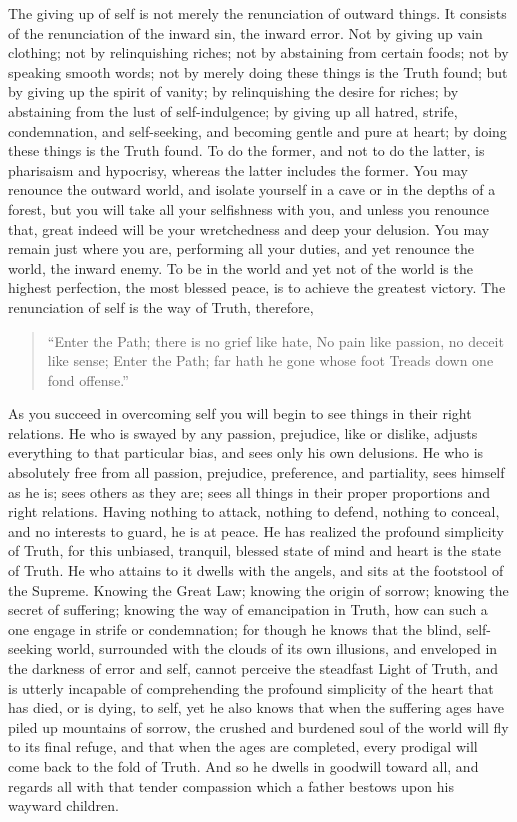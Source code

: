 \documentclass[12pt,oneside]{scrbook}
\begin{document}
  The giving up of self is not merely the renunciation of outward things.
  It consists of the renunciation of the inward sin, the inward error. Not
  by giving up vain clothing; not by relinquishing riches; not by
  abstaining from certain foods; not by speaking smooth words; not by
  merely doing these things is the Truth found; but by giving up the
  spirit of vanity; by relinquishing the desire for riches; by abstaining
  from the lust of self-indulgence; by giving up all hatred, strife,
  condemnation, and self-seeking, and becoming gentle and pure at heart;
  by doing these things is the Truth found. To do the former, and not to
  do the latter, is pharisaism and hypocrisy, whereas the latter includes
  the former. You may renounce the outward world, and isolate yourself in
  a cave or in the depths of a forest, but you will take all your
  selfishness with you, and unless you renounce that, great indeed will be
  your wretchedness and deep your delusion. You may remain just where you
  are, performing all your duties, and yet renounce the world, the inward
  enemy. To be in the world and yet not of the world is the highest
  perfection, the most blessed peace, is to achieve the greatest victory.
  The renunciation of self is the way of Truth, therefore,
  
  \begin{quote}
  ``Enter the Path; there is no grief like hate, No pain like passion, no
  deceit like sense; Enter the Path; far hath he gone whose foot Treads
  down one fond offense.''
  \end{quote}
  
  As you succeed in overcoming self you will begin to see things in their
  right relations. He who is swayed by any passion, prejudice, like or
  dislike, adjusts everything to that particular bias, and sees only his
  own delusions. He who is absolutely free from all passion, prejudice,
  preference, and partiality, sees himself as he is; sees others as they
  are; sees all things in their proper proportions and right relations.
  Having nothing to attack, nothing to defend, nothing to conceal, and no
  interests to guard, he is at peace. He has realized the profound
  simplicity of Truth, for this unbiased, tranquil, blessed state of mind
  and heart is the state of Truth. He who attains to it dwells with the
  angels, and sits at the footstool of the Supreme. Knowing the Great Law;
  knowing the origin of sorrow; knowing the secret of suffering; knowing
  the way of emancipation in Truth, how can such a one engage in strife or
  condemnation; for though he knows that the blind, self-seeking world,
  surrounded with the clouds of its own illusions, and enveloped in the
  darkness of error and self, cannot perceive the steadfast Light of
  Truth, and is utterly incapable of comprehending the profound simplicity
  of the heart that has died, or is dying, to self, yet he also knows that
  when the suffering ages have piled up mountains of sorrow, the crushed
  and burdened soul of the world will fly to its final refuge, and that
  when the ages are completed, every prodigal will come back to the fold
  of Truth. And so he dwells in goodwill toward all, and regards all with
  that tender compassion which a father bestows upon his wayward children.
  
\end{document}
